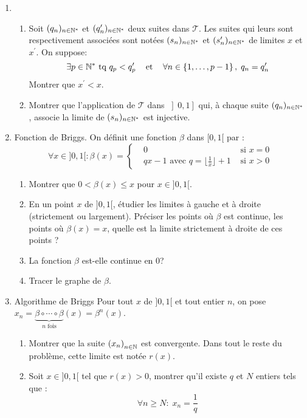 \begin{enumerate}
\item \begin{enumerate} \item Soit $(q_{n})_{n\in \mathbb{N}^{*}}$ et $(q_{n}^{\prime })_{n\in \mathbb{N}^*}$ deux suites dans $\mathcal{T}$. Les suites qui leurs sont respectivement associ{\'e}es sont not{\'e}es $(s_{n})_{n\in \mathbb{N}^{*}}$ et $(s_{n}^{\prime})_{n\in \mathbb{N}^{*}}$ de limites $x$ et $x^{\prime }$. On suppose:
\begin{displaymath}
  \exists p \in \mathbb{N}^* \text{ tq } q_{p}<q_{p}^{\prime } \hspace{0.3cm} \text{ et } \hspace{0.3cm}  \forall n\in \left\{1,\ldots ,p-1\right\},\;q_{n}=q_{n}^{\prime }
\end{displaymath}
Montrer que $x^{\prime }<x$.

\item Montrer que l'application de $\mathcal{T}$ dans $\left]0,1\right] $ qui, {\`a} chaque suite $(q_{n})_{n\in \mathbb{N}^{*}}$, associe la limite de $(s_{n})_{n\in \mathbb{N}^{*}}$ est injective.
\end{enumerate}


\item Fonction de Briggs.\newline
On définit une fonction $\beta$ dans $[0,1[$ par :
\begin{displaymath}
 \forall x\in ]0,1[ : 
\beta(x)=\left\lbrace
\begin{aligned}
 &0 &\text{ si } x=0 \\
&qx-1 \text{ avec } q=\lfloor\frac{1}{x}\rfloor +1 &\text{ si } x>0
\end{aligned}
 \right. 
\end{displaymath}
\begin{enumerate}
 \item Montrer que $0<\beta(x)\leq x$ pour $x\in ]0,1[$.
\item En un point $x$ de $]0,1[$, étudier les limites à gauche et à droite (strictement ou largement). Préciser les points où $\beta$ est continue, les points où $\beta(x)=x$, quelle est la limite strictement à droite de ces points ?
\item La fonction $\beta$ est-elle continue en $0$?
\item Tracer le graphe de $\beta$.
\end{enumerate}

\item Algorithme de Briggs\newline
Pour tout $x$ de $]0,1[$ et tout entier $n$, on pose 
$x_n=\underset{n\text{ fois}}{\underbrace{\beta\circ\cdots\circ\beta}}(x)=\beta^n(x)$.
\begin{enumerate}
 \item Montrer que la suite $\left(x_n \right)_{n\in\mathbb{N}}$ est convergente. Dans tout le reste du problème, cette limite est notée $r(x)$.
\item Soit $x\in]0,1[$ tel que $r(x)>0$, montrer qu'il existe $q$ et $N$ entiers tels que :
\begin{displaymath}
 \forall n\geq N :\; x_n = \frac{1}{q}
\end{displaymath}


\end{enumerate}
\end{enumerate}
